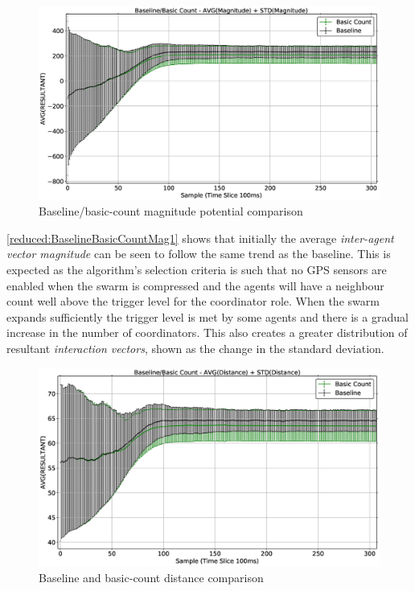 \begin{figure}[H]
\begin{center}
\includegraphics[width=14cm]{CHAPTER-6/figures/BaselineBasicCountMag1}
\end{center}
\caption{Baseline/basic-count magnitude potential comparison\label{reduced:BaselineBasicCountMag1}}
\end{figure}

\autoref{reduced:BaselineBasicCountMag1} shows that initially the average \textit{inter-agent vector magnitude} can be seen to follow the same trend as the baseline. This is expected as the algorithm's selection criteria is such that no GPS sensors are enabled when the swarm is compressed and the agents will have a neighbour count well above the trigger level for the coordinator role. When the swarm expands sufficiently the trigger level is met by some agents and there is a gradual increase in the number of coordinators. This also creates a greater distribution of resultant \textit{interaction vectors}, shown as the change in the standard deviation. 

\begin{figure}[H]
\begin{center}
\includegraphics[width=14cm]{CHAPTER-6/figures/BaselineBasicCountDist1}
\end{center}
\caption{Baseline and basic-count distance comparison\label{reduced:BaselineBasicCountDist1}}
\end{figure}
 
